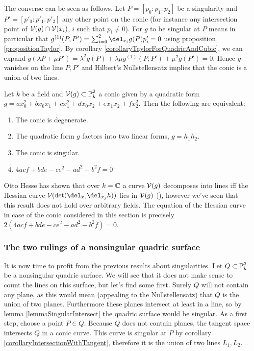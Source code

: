 The converse can be seen as follows. Let $P=[p_0:p_1:p_2]$ be a singularity and $P'=[p'_0:p'_1:p'_2]$ any other point on the conic (for instance any intersection point of $\operatorname{\mathcal V}(g) \cap \operatorname{\mathcal V}(x_i)$, $i$ such that $p_i \neq 0$).
For $g$ to be singular at $P$ means in particular that $g^{(1)}(P,P') = \sum_{i=0}^2 \del_{x_i}g(P)p'_i = 0$ using proposition \ref{propositionTaylor}.
By corollary \ref{corollaryTaylorForQuadricAndCubic}, we can expand $g(\lambda P + \mu P') = \lambda^2 g(P) + \lambda\mu g^{(1)}(P;P') + \mu^2 g(P')= 0$.
Hence $g$ vanishes on the line $\overline{P,P'}$ and Hilbert's Nullstellensatz implies that the conic is a union of two lines.

\begin{theorem}
Let $k$ be a field and $\operatorname{\mathcal V}(g) \subset \operatorname{\mathbb P}^2_k$ a conic given by a quadratic form $g = ax_0^2 + bx_0x_1 + cx_1^2 + dx_0x_2 + ex_1x_2 + fx_2^2$.
Then the following are equivalent:
\begin{enumerate}
\item The conic is degenerate.
\item The quadratic form $g$ factors into two linear forms, $g=h_1h_2$.
\item The conic is singular.
\item $4acf + bde - ce^2 - ad^2 - b^2f = 0$
\end{enumerate}
\end{theorem}


\begin{remark}
Otto Hesse has shown that over $k=\operatorname{\mathbb C}$ a curve $\operatorname{\mathcal V}(g)$ decomposes into lines iff the Hessian curve $\V(\det(\del_{x_i}\del_{x_j}h))$ lies in $\operatorname{\mathcal V}(g)$ (\cite[p.289]{brieskorn2012plane}), however we've seen that this result does not hold over arbitrary fields.
The equation of the Hessian curve in case of the conic considered in this section is precisely $2(4acf + bde - ce^2 - ad^2 - b^2f) = 0$.
\end{remark}


\subsubsection{The two rulings of a nonsingular quadric surface}


It is now time to profit from the previous results about singularities.
Let $Q \subset \operatorname{\mathbb P}^3_k$ be a nonsingular quadric surface.
We will see that it does not make sense to count the lines on this surface, but let's find some first.
Surely $Q$ will not contain any plane, as this would mean (appealing to the Nullstellensatz) that $Q$ is the union of two planes.
Furthermore these planes intersect at least in a line, so by lemma \ref{lemmaSingularIntersect} the quadric surface would be singular.
As a first step, choose a point $P \in Q$.
Because $Q$ does not contain planes, the tangent space intersects $Q$ in a conic curve.
This curve is singular at $P$ by corollary \ref{corollaryIntersectionWithTangent}, therefore it is the union of two lines $L_1,L_2$.

